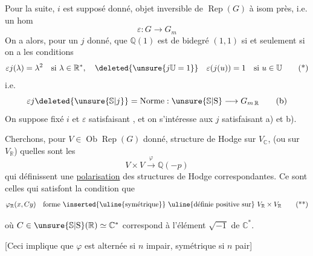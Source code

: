 Pour la suite, $i$ est supposé donné,  objet inversible  de $\operatorname{Rep}(G)$ à isom près, i.e. un hom \unsure{$\varepsilon$}
\[
\varepsilon:G\longrightarrow G_m
\]
On a alors, pour un $j$ donné, que $\mathbb{Q}(1)$ est de bidegré $(1,1)$ si et seulement si on a les conditions
\[
\varepsilon j(\lambda)=\lambda^2\quad\text{si }\lambda\in\mathbb{R}^{*},\quad
\deleted{\unsure{j\mathbb{U}=1}}\quad
\varepsilon(j(u))=1\quad\text{si }u\in\mathbb{U}\tag*{(*)}
\]
i.e.
\[
\varepsilon j\deleted{\unsure{\mathbb{S}|j}}=\mathrm{Norme}:\unsure{\mathbb{S}|\mathrm{S}}\longrightarrow G_{m\,\mathbb{R}}\tag*{(b)}
\]
On suppose fixé $i$ et $\varepsilon$ satisfaisant , et on s'intéresse aux $j$ satisfaisant a) et b).

 Cherchons, pour $V\in\operatorname{Ob}\operatorname{Rep}(G)$ donné,  structure de Hodge sur $V_{\mathbb{C}}$, (ou sur $V_{\mathbb{R}}$) quelles sont les 
\[
V\times V\xrightarrow{\varphi}\mathbb{Q}(-p)
\]
qui définissent une \uline{polarisation} des structures de Hodge correspondantes. Ce sont celles qui satisfont  la condition que
\[
\varphi_{\mathbb{R}}(x,Cy)\quad\text{forme \inserted{\uline{symétrique}} \uline{définie positive sur} } V_{\mathbb{R}}\times V_{\mathbb{R}}\tag*{(**)}
\]



où $C\in\unsure{\mathbb{S}|\mathrm{S}}(\mathbb{R})\simeq\mathbb{C}^{*}$ correspond à l'élément $\sqrt{-1}$ de $\mathbb{C}^{*}$.

[Ceci implique que $\varphi$ est alternée si $n$ impair, symétrique si $n$ pair]

